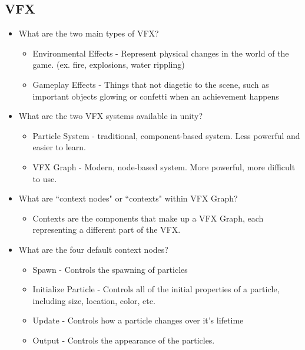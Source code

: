 \documentclass{article}
\begin{document}
\subsection{VFX}
\begin{itemize}
    \item What are the two main types of VFX?
    \begin{itemize}
        \item Environmental Effects - Represent physical changes in the world of the game. (ex. fire, explosions, water rippling)
        \item Gameplay Effects - Things that not diagetic to the scene, such as important objects glowing or confetti when an achievement happens
    \end{itemize}
    \item What are the two VFX systems available in unity?
    \begin{itemize}
        \item Particle System - traditional, component-based system. Less powerful and easier to learn.
        \item VFX Graph - Modern, node-based system. More powerful, more difficult to use.
    \end{itemize}
    \item What are ``context nodes" or ``contexts" within VFX Graph?
    \begin{itemize}
        \item Contexts are the components that make up a VFX Graph, each representing a different part of the VFX.
    \end{itemize}
    \item What are the four default context nodes?
    \begin{itemize}
        \item Spawn - Controls the spawning of particles
        \item Initialize Particle - Controls all of the initial properties of a particle, including size, location, color, etc.
        \item Update - Controls how a particle changes over it's lifetime
        \item Output - Controls the appearance of the particles.
    \end{itemize}
\end{itemize}
\end{document}
